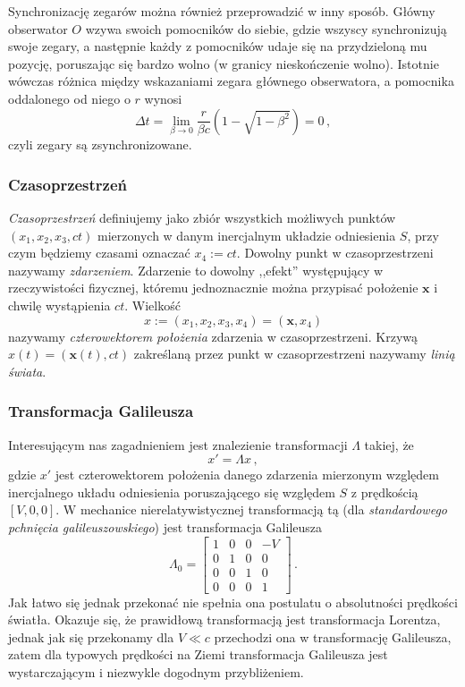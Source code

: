 \documentclass[../main.tex]{subfiles}
\begin{document}
Synchronizację zegarów można również przeprowadzić w inny sposób. Główny obserwator \(O\) wzywa
swoich pomocników do siebie, gdzie wszyscy synchronizują swoje zegary, a następnie każdy z
pomocników udaje się na przydzieloną mu pozycję, poruszając się bardzo wolno (w granicy
nieskończenie wolno). Istotnie wówczas różnica między wskazaniami zegara głównego obserwatora, a
pomocnika oddalonego od niego o \(r\) wynosi
\begin{equation*}
    \Delta t=\lim_{\beta\to0}\frac{r}{\beta c}\left(1-\sqrt{1-\beta^2}\right)=0\,,
\end{equation*}
czyli zegary są zsynchronizowane.
\subsubsection{Czasoprzestrzeń}
\textit{Czasoprzestrzeń} definiujemy jako zbiór wszystkich możliwych punktów \((x_1,x_2,x_3,ct)\)
mierzonych w danym inercjalnym układzie odniesienia \(S\), przy czym będziemy czasami oznaczać
\(x_4:=ct\). Dowolny punkt w czasoprzestrzeni nazywamy \textit{zdarzeniem}. Zdarzenie to dowolny
,,efekt'' występujący w rzeczywistości fizycznej, któremu jednoznacznie można przypisać położenie
\(\mathbf{x}\) i chwilę wystąpienia \(ct\). Wielkość
\begin{equation*}
    x:=(x_1,x_2,x_3,x_4)=(\mathbf{x},x_4)
\end{equation*}
nazywamy \textit{czterowektorem położenia} zdarzenia w czasoprzestrzeni. Krzywą
\(x(t)=(\mathbf{x}(t),ct)\) zakreślaną przez punkt w czasoprzestrzeni nazywamy \textit{linią
świata}.
\subsubsection{Transformacja Galileusza}
Interesującym nas zagadnieniem jest znalezienie transformacji \(\Lambda\) takiej, że
\begin{equation*}
    x'=\Lambda x\,,
\end{equation*}
gdzie \(x'\) jest czterowektorem położenia danego zdarzenia mierzonym względem inercjalnego układu
odniesienia poruszającego się względem \(S\) z prędkością \([V,0,0]\). W mechanice
nierelatywistycznej transformacją tą (dla \textit{standardowego pchnięcia galileuszowskiego}) jest
transformacja Galileusza
\begin{equation*}
    \Lambda_0=\left[\begin{array}{cccc}
         1&0&0&-V  \\
         0&1&0&0  \\
         0&0&1&0  \\
         0&0&0&1  
    \end{array}\right]\,.
\end{equation*}
Jak łatwo się jednak przekonać nie spełnia ona postulatu o absolutności prędkości światła. Okazuje
się, że prawidłową transformacją jest transformacja Lorentza, jednak jak się przekonamy dla \(V\ll
c\) przechodzi ona w transformację Galileusza, zatem dla typowych prędkości na Ziemi transformacja
Galileusza jest wystarczającym i niezwykle dogodnym przybliżeniem.
\end{document}
